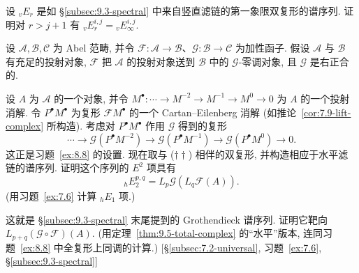 \begin{prob}\label{ex:9.9}
设 ${}_vE_r$ 是如 \S\ref{subsec:9.3-spectral} 中来自竖直滤链的第一象限双复形的谱序列. 证明对 $r>j+1$ 有 ${}_vE_r^{i,j}={}_vE_\infty^{i,j}$.
\end{prob}

\begin{prob}\label{ex:9.10}
设 $\mathcal{A},\mathcal{B},\mathcal{C}$ 为 Abel 范畴, 并令 $\mathcal{F}:\mathcal{A}\to\mathcal{B}$、$\mathcal{G}:\mathcal{B}\to\mathcal{C}$ 为加性函子. 假设 $\mathcal{A}$ 与 $\mathcal{B}$ 有充足的投射对象, $\mathcal{F}$ 把 $\mathcal{A}$ 的投射对象送到 $\mathcal{B}$ 中的 $\mathcal{G}$-零调对象, 且 $\mathcal{G}$ 是右正合的.

设 $A$ 为 $\mathcal{A}$ 的一个对象, 并令 $M^\bullet:\cdots\to M^{-2}\to M^{-1}\to M^0\to 0$ 为 $A$ 的一个投射消解. 令 $P^\bullet M^\bullet$ 为复形 $\mathcal{F}M^\bullet$ 的一个 Cartan–Eilenberg 消解 (如推论~\ref{cor:7.9-lift-complex} 所构造). 考虑对 $P^\bullet M^\bullet$ 作用 $\mathcal{G}$ 得到的复形
\begin{equation*}\tag{$\dagger\dagger$}
\cdots\to \mathcal{G}(P^\bullet M^{-2})\to \mathcal{G}(P^\bullet M^{-1})\to \mathcal{G}(P^\bullet M^0)\to 0 .
\end{equation*}
这正是习题~\ref{ex:8.8} 的设置. 现在取与 ($\dagger\dagger$) 相伴的双复形, 并构造相应于水平滤链的谱序列. 证明这个序列的 $E^2$ 项具有
\[
{}_hE_2^{p,q}=L_p\mathcal{G}(L_q\mathcal{F}(A)).
\]
(用习题~\ref{ex:7.6} 计算 ${}_hE_1$ 项.)

这就是 \S\ref{subsec:9.3-spectral} 末尾提到的 Grothendieck 谱序列. 证明它靶向 $L_{p+q}(\mathcal{G}\circ\mathcal{F})(A)$. (用定理~\ref{thm:9.5-total-complex} 的“水平”版本, 连同习题~\ref{ex:8.8} 中全复形上同调的计算.) [\S\ref{subsec:7.2-universal}, 习题~\ref{ex:7.6}, \S\ref{subsec:9.3-spectral}]
\end{prob}
